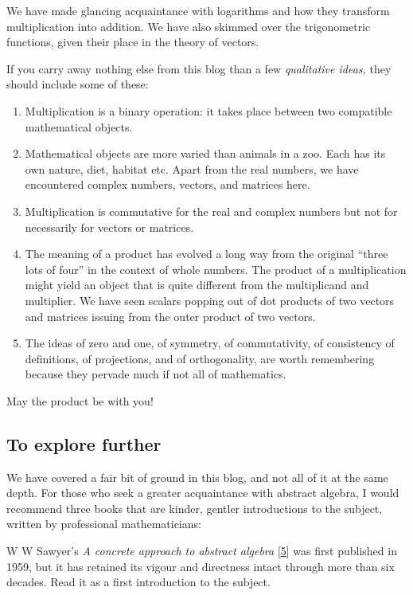 \documentclass[
  a4paper,
]{article}
\begin{document}
We have made glancing acquaintance with logarithms and how they
transform multiplication into addition. We have also skimmed over the
trigonometric functions, given their place in the theory of vectors.

If you carry away nothing else from this blog than a few
\emph{qualitative ideas,} they should include some of these:

\begin{enumerate}
\item
  Multiplication is a binary operation: it takes place between two
  compatible mathematical objects.
\item
  Mathematical objects are more varied than animals in a zoo. Each has
  its own nature, diet, habitat etc. Apart from the real numbers, we
  have encountered complex numbers, vectors, and matrices here.
\item
  Multiplication is commutative for the real and complex numbers but not
  for necessarily for vectors or matrices.
\item
  The meaning of a product has evolved a long way from the original
  ``three lots of four'' in the context of whole numbers. The product of
  a multiplication might yield an object that is quite different from
  the multiplicand and multiplier. We have seen scalars popping out of
  dot products of two vectors and matrices issuing from the outer
  product of two vectors.
\item
  The ideas of zero and one, of symmetry, of commutativity, of
  consistency of definitions, of projections, and of orthogonality, are
  worth remembering because they pervade much if not all of mathematics.
\end{enumerate}

May the product be with you!

\hypertarget{to-explore-further}{%
\subsection{To explore further}\label{to-explore-further}}

We have covered a fair bit of ground in this blog, and not all of it at
the same depth. For those who seek a greater acquaintance with abstract
algebra, I would recommend three books that are kinder, gentler
introductions to the subject, written by professional mathematicians:

W W Sawyer's \emph{A concrete approach to abstract algebra}
{[}\protect\hyperlink{ref-sawyer1959}{5}{]} was first published in 1959,
but it has retained its vigour and directness intact through more than
six decades. Read it as a first introduction to the subject.
\end{document}
